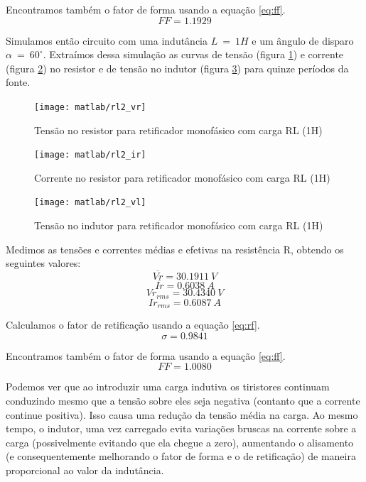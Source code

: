 \documentclass{report}
\begin{document}
Encontramos também o fator de forma usando a equação \ref{eq:ff}.
\begin{equation}
FF = 1.1929
\end{equation}

Simulamos então circuito com uma indutância $L\ =\ 1H$ e um ângulo de disparo $\alpha\ =\ 60^\circ$. Extraímos dessa simulação as curvas de tensão (figura \ref{fig:rl2vr}) e corrente (figura \ref{fig:rl2ir}) no resistor e de tensão no indutor (figura \ref{fig:rl2vl}) para quinze períodos da fonte.
\begin{figure}[H]
	\centering
	\texttt{[image: matlab/rl2\_vr]}
	\caption{Tensão no resistor para retificador monofásico com carga RL (1H)}
	\label{fig:rl2vr}
\end{figure}
\begin{figure}[H]
	\centering
	\texttt{[image: matlab/rl2\_ir]}
	\caption{Corrente no resistor para retificador monofásico com carga RL (1H)}
	\label{fig:rl2ir}
\end{figure}
\begin{figure}[H]
	\centering
	\texttt{[image: matlab/rl2\_vl]}
	\caption{Tensão no indutor para retificador monofásico com carga RL (1H)}
	\label{fig:rl2vl}
\end{figure}
Medimos as tensões e correntes médias e efetivas na resistência R, obtendo os seguintes valores:
\begin{equation}
\overline{Vr} = 30.1911\ V
\end{equation}
\begin{equation}
\overline{Ir} =  0.6038\ A
\end{equation}
\begin{equation}
Vr_{rms} =  30.4340\ V
\end{equation}
\begin{equation}
Ir_{rms} =    0.6087\ A
\end{equation}

Calculamos o fator de retificação usando a equação \ref{eq:rf}.
\begin{equation}
\sigma =  0.9841
\end{equation}

Encontramos também o fator de forma usando a equação \ref{eq:ff}.
\begin{equation}
FF = 1.0080
\end{equation}

Podemos ver que ao introduzir uma carga indutiva os tiristores continuam conduzindo mesmo que a tensão sobre eles seja negativa (contanto que a corrente continue positiva). Isso causa uma redução da tensão média na carga. Ao mesmo tempo, o indutor, uma vez carregado evita variações bruscas na corrente sobre a carga (possivelmente evitando que ela chegue a zero), aumentando o alisamento (e consequentemente melhorando o fator de forma e o de retificação) de maneira proporcional ao valor da indutância.
\end{document}
